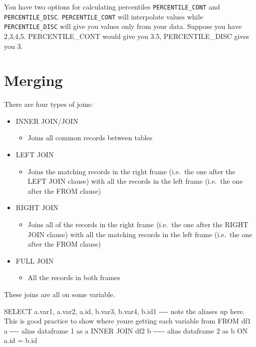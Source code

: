 \documentclass[
  letterpaper,
  DIV=11,
  numbers=noendperiod]{scrreprt}
\newenvironment{Shaded}{\begin{snugshade}}{\end{snugshade}}
\newcommand{\CommentTok}[1]{\textcolor[rgb]{0.37,0.37,0.37}{#1}}
\newcommand{\KeywordTok}[1]{\textcolor[rgb]{0.00,0.23,0.31}{#1}}
\newcommand{\NormalTok}[1]{\textcolor[rgb]{0.00,0.23,0.31}{#1}}
\newcommand{\OperatorTok}[1]{\textcolor[rgb]{0.37,0.37,0.37}{#1}}
\providecommand{\tightlist}{%
  \setlength{\itemsep}{0pt}\setlength{\parskip}{0pt}}\usepackage{longtable,booktabs,array}
\begin{document}
You have two options for calculating percentiles
\texttt{PERCENTILE\_CONT} and \texttt{PERCENTILE\_DISC}.
\texttt{PERCENTILE\_CONT} will interpolate values while
\texttt{PERCENTILE\_DISC} will give you values only from your data.
Suppose you have 2,3,4,5. PERCENTILE\_CONT would give you 3.5,
PERCENTILE\_DISC gives you 3.

\hypertarget{merging}{%
\section{Merging}\label{merging}}

There are four types of joins:

\begin{itemize}
\tightlist
\item
  INNER JOIN/JOIN

  \begin{itemize}
  \tightlist
  \item
    Joins all common records between tables
  \end{itemize}
\item
  LEFT JOIN

  \begin{itemize}
  \tightlist
  \item
    Joins the matching records in the right frame (i.e.~the one after
    the LEFT JOIN clause) with all the records in the left frame
    (i.e.~the one after the FROM clause)
  \end{itemize}
\item
  RIGHT JOIN

  \begin{itemize}
  \tightlist
  \item
    Joins all of the records in the right frame (i.e.~the one after the
    RIGHT JOIN clause) with all the matching records in the left frame
    (i.e.~the one after the FROM clause)
  \end{itemize}
\item
  FULL JOIN

  \begin{itemize}
  \tightlist
  \item
    All the records in both frames
  \end{itemize}
\end{itemize}

These joins are all on some variable.

\begin{Shaded}
\begin{Highlighting}[]
\KeywordTok{SELECT}\NormalTok{ a.var1, a.var2, a.}\KeywordTok{id}\NormalTok{, b.var3, b.var4, b.id1 }\CommentTok{{-}{-}{-}{-} note the aliases up here.  This is good practice to show where you\textquotesingle{}re getting each variable from}
\KeywordTok{FROM}\NormalTok{ df1 a }\CommentTok{{-}{-}{-}{-} alias dataframe 1 as a}
\KeywordTok{INNER} \KeywordTok{JOIN}\NormalTok{ df2 b }\CommentTok{{-}{-}{-}{-}{-} alias dataframe 2 as b}
\KeywordTok{ON}\NormalTok{ a.}\KeywordTok{id} \OperatorTok{=}\NormalTok{ b.}\KeywordTok{id}
\end{Highlighting}
\end{Shaded}
\end{document}

